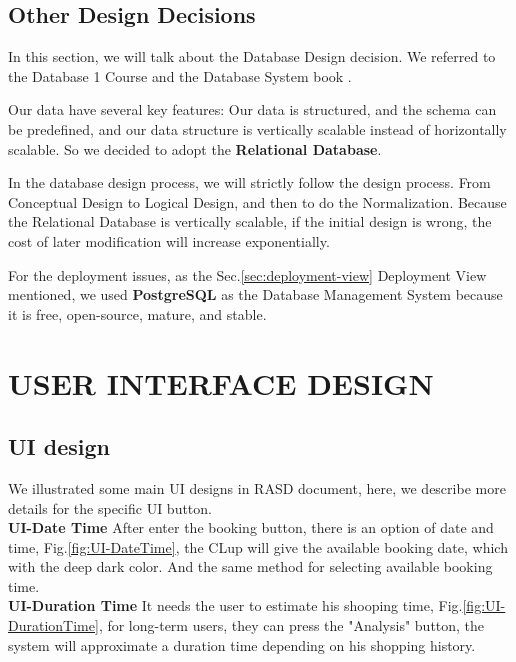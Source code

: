 \documentclass[a4paper,12pt]{report}
\begin{document}
\section{Other Design Decisions}

In this section, we will talk about the Database Design decision. We referred to the Database 1 Course \cite{Database1Course} and the Database System book \cite{DatabaseSystemBook}.

Our data have several key features: Our data is structured, and the schema can be predefined, and our data structure is vertically scalable instead of horizontally scalable.
So we decided to adopt the \textbf{Relational Database}.

In the database design process, we will strictly follow the design process.
From Conceptual Design to Logical Design, and then to do the Normalization.
Because the Relational Database is vertically scalable, if the initial design is wrong, the cost of later modification will increase exponentially.

For the deployment issues, as the Sec.\ref{sec:deployment-view} Deployment View mentioned, we used \textbf{PostgreSQL} as the Database Management System because it is free, open-source, mature, and stable.



\chapter{USER INTERFACE DESIGN}\label{ch:user-interface-design}

\section{UI design}
We illustrated some main UI designs in RASD document, here, we describe more details for the specific UI button. ~\\

\textbf{UI-Date Time} After enter the booking button, there is an option of date and time, Fig.\ref{fig:UI-DateTime}, the CLup will give the available booking date, which with the deep dark color. And the same method for selecting available booking time.~\\

\textbf{UI-Duration Time} It needs the user to estimate his shooping time, Fig.\ref{fig:UI-DurationTime}, for long-term users, they can press the "Analysis" button, the system will approximate a duration time depending on his shopping history.~\\
\end{document}
